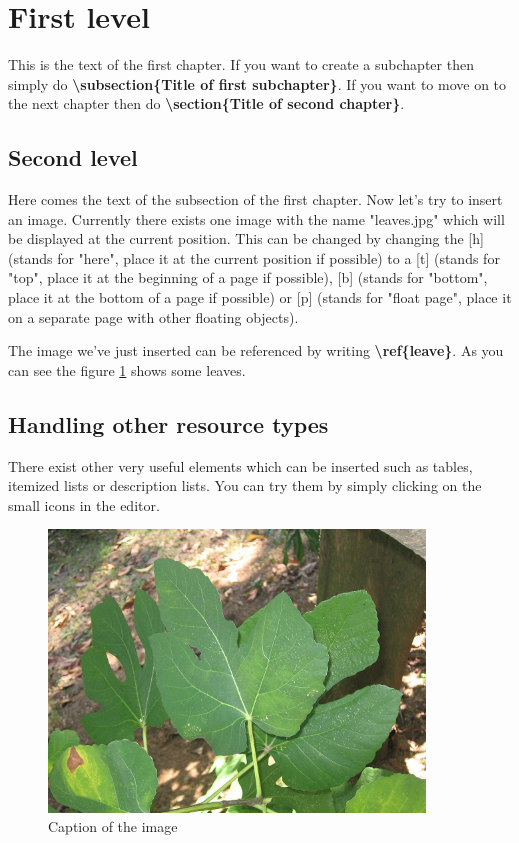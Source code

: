 \documentclass{article}
\begin{document}


\section{First level}

This is the text of the first chapter. If you want to create a subchapter then simply do \textbf{\textbackslash subsection\{Title of first subchapter\}}. If you want to move on to the next chapter then do \textbf{\textbackslash section\{Title of second chapter\}}.

\subsection{Second level}

Here comes the text of the subsection of the first chapter. Now let's try to insert an image. Currently there exists one image with the name "leaves.jpg" which will be displayed at the current position. This can be changed by changing the [h] (stands for "here", place it at the current position if possible) to a [t] (stands for "top", place it at the beginning of a page if possible), [b] (stands for "bottom", place it at the bottom of a page if possible) or [p] (stands for "float page", place it on a separate page with other floating objects).

The image we've just inserted can be referenced by writing \textbf{\textbackslash ref\{leave\}}. As you can see the figure \ref{leave} shows some leaves.

\subsection{Handling other resource types}

There exist other very useful elements which can be inserted such as tables, itemized lists or description lists. You can try them by simply clicking on the small icons in the editor.

\begin{figure}[htp]
\begin{center}
	\includegraphics[width=100mm]{leaves.jpg}
	\caption{Caption of the image}
	\label{leave}
\end{center}
\end{figure}
\end{document}
